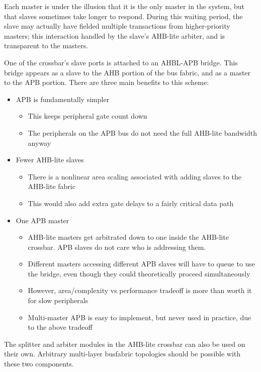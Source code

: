 \documentclass{article}
\begin{document}
Each master is under the illusion that it is the only master in the system, but that slaves sometimes take longer to respond. During this waiting period, the slave may actually have fielded multiple transactions from higher-priority masters; this interaction handled by the slave's AHB-lite arbiter, and is transparent to the masters.

One of the crossbar's slave ports is attached to an AHBL-APB bridge. This bridge appears as a slave to the AHB portion of the bus fabric, and as a master to the APB portion. There are three main benefits to this scheme:

\begin{itemize}
	\item APB is fundamentally simpler
	\begin{itemize}
		\item This keeps peripheral gate count down
		\item The peripherals on the APB bus do not need the full AHB-lite bandwidth anyway
	\end{itemize}
	\item Fewer AHB-lite slaves
	\begin{itemize}
		\item There is a nonlinear area scaling associated with adding slaves to the AHB-lite fabric
		\item This would also add extra gate delays to a fairly critical data path
	\end{itemize}
	\item One APB master
	\begin{itemize}
		\item AHB-lite masters get arbitrated down to one inside the AHB-lite crossbar. APB slaves do not care who is addressing them.
		\item Different masters accessing different APB slaves will have to queue to use the bridge, even though they could theoretically proceed simultaneously
		\item However, area/complexity vs performance tradeoff is more than worth it for slow peripherals
		\item Multi-master APB is easy to implement, but never used in practice, due to the above tradeoff
	\end{itemize}
\end{itemize}

The splitter and arbiter modules in the AHB-lite crossbar can also be used on their own. Arbitrary multi-layer busfabric topologies should be possible with these two components.
\end{document}
